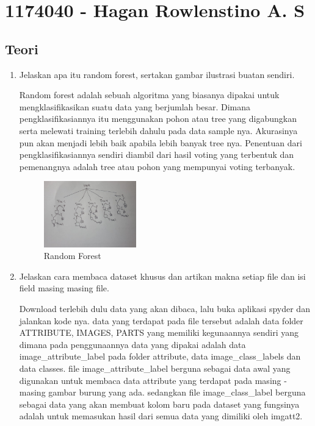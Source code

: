 \section{1174040 - Hagan Rowlenstino A. S}
    \subsection{Teori}
    \begin{enumerate}
        \item Jelaskan apa itu random forest, sertakan gambar ilustrasi buatan sendiri.\par
        Random forest adalah sebuah algoritma yang biasanya dipakai untuk mengklasifikasikan suatu data yang berjumlah besar. Dimana pengklasifikasiannya itu menggunakan pohon atau tree yang digabungkan serta melewati training terlebih dahulu pada data sample nya. Akurasinya pun akan menjadi lebih baik apabila lebih banyak tree nya. Penentuan dari pengklasifikasiannya sendiri diambil dari hasil voting yang terbentuk dan pemenangnya adalah tree atau pohon yang mempunyai voting terbanyak.
        \begin{figure}[H]
            \includegraphics[width=4cm]{figures/1174040/chapter3/forest.jpeg}
            \centering
            \caption{Random Forest}
        \end{figure}
        \item Jelaskan cara membaca dataset khusus dan artikan makna setiap ﬁle dan isi ﬁeld masing masing ﬁle.\par
        Download terlebih dulu data yang akan dibaca, lalu buka aplikasi spyder dan jalankan kode nya. data yang terdapat pada file tersebut adalah data folder ATTRIBUTE, IMAGES, PARTS yang memiliki kegunaannya sendiri yang dimana pada penggunaannya data yang dipakai adalah data image\_attribute\_label pada folder attribute, data image\_class\_labels dan data classes.
        file image\_attribute\_label berguna sebagai data awal yang digunakan untuk membaca data attribute yang terdapat pada masing - masing gambar burung yang ada.
        sedangkan file image\_class\_label berguna sebagai data yang akan membuat kolom baru pada dataset yang fungsinya adalah untuk memasukan hasil dari semua data yang dimiliki oleh imgatt2.

\end{enumerate}

